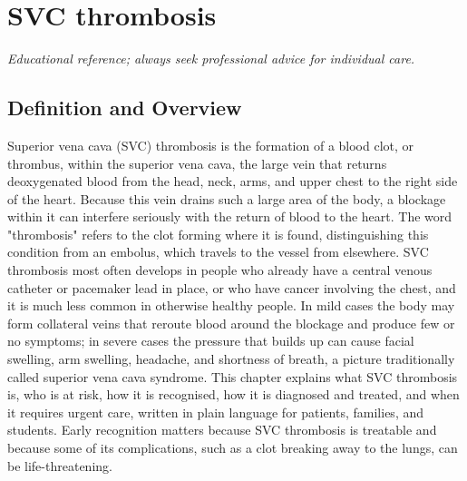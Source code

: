 \chapter{SVC thrombosis}

\medskip
\noindent\textit{Educational reference; always seek professional advice for individual care.}

\section*{Definition and Overview}
Superior vena cava (SVC) thrombosis is the formation of a blood clot, or thrombus, within the superior vena cava, the large vein that returns deoxygenated blood from the head, neck, arms, and upper chest to the right side of the heart. Because this vein drains such a large area of the body, a blockage within it can interfere seriously with the return of blood to the heart. The word "thrombosis" refers to the clot forming where it is found, distinguishing this condition from an embolus, which travels to the vessel from elsewhere. SVC thrombosis most often develops in people who already have a central venous catheter or pacemaker lead in place, or who have cancer involving the chest, and it is much less common in otherwise healthy people. In mild cases the body may form collateral veins that reroute blood around the blockage and produce few or no symptoms; in severe cases the pressure that builds up can cause facial swelling, arm swelling, headache, and shortness of breath, a picture traditionally called superior vena cava syndrome. This chapter explains what SVC thrombosis is, who is at risk, how it is recognised, how it is diagnosed and treated, and when it requires urgent care, written in plain language for patients, families, and students. Early recognition matters because SVC thrombosis is treatable and because some of its complications, such as a clot breaking away to the lungs, can be life-threatening.

